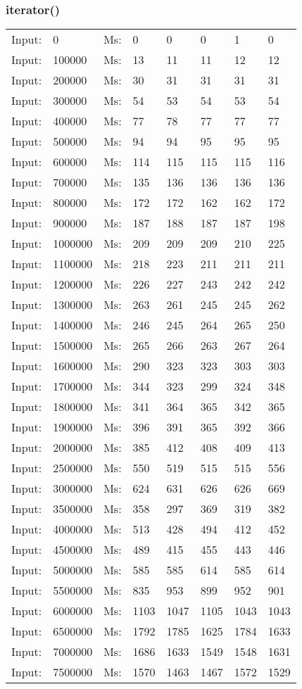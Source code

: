 \documentclass[11pt,a4paper]{report}
\begin{document}
\begin{tiny}
\subsubsection*{iterator()}
\begin{tabular}{l l ||l  l  l  l  l  l}
Input:&0&Ms:&0&0&0&1&0\\
Input:&100000&Ms:&13&11&11&12&12\\
Input:&200000&Ms:&30&31&31&31&31\\
Input:&300000&Ms:&54&53&54&53&54\\
Input:&400000&Ms:&77&78&77&77&77\\
Input:&500000&Ms:&94&94&95&95&95\\
Input:&600000&Ms:&114&115&115&115&116\\
Input:&700000&Ms:&135&136&136&136&136\\
Input:&800000&Ms:&172&172&162&162&172\\
Input:&900000&Ms:&187&188&187&187&198\\
Input:&1000000&Ms:&209&209&209&210&225\\
Input:&1100000&Ms:&218&223&211&211&211\\
Input:&1200000&Ms:&226&227&243&242&242\\
Input:&1300000&Ms:&263&261&245&245&262\\
Input:&1400000&Ms:&246&245&264&265&250\\
Input:&1500000&Ms:&265&266&263&267&264\\
Input:&1600000&Ms:&290&323&323&303&303\\
Input:&1700000&Ms:&344&323&299&324&348\\
Input:&1800000&Ms:&341&364&365&342&365\\
Input:&1900000&Ms:&396&391&365&392&366\\
Input:&2000000&Ms:&385&412&408&409&413\\
Input:&2500000&Ms:&550&519&515&515&556\\
Input:&3000000&Ms:&624&631&626&626&669\\
Input:&3500000&Ms:&358&297&369&319&382\\
Input:&4000000&Ms:&513&428&494&412&452\\
Input:&4500000&Ms:&489&415&455&443&446\\
Input:&5000000&Ms:&585&585&614&585&614\\
Input:&5500000&Ms:&835&953&899&952&901\\
Input:&6000000&Ms:&1103&1047&1105&1043&1043\\
Input:&6500000&Ms:&1792&1785&1625&1784&1633\\
Input:&7000000&Ms:&1686&1633&1549&1548&1631\\
Input:&7500000&Ms:&1570&1463&1467&1572&1529\\
\end{tabular}


\end{tiny}
\end{document}
